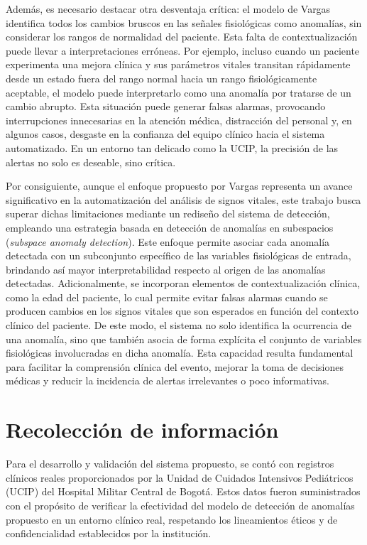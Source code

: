 Además, es necesario destacar otra desventaja crítica: el modelo de Vargas identifica todos los cambios bruscos en las señales fisiológicas como anomalías, sin considerar los rangos de normalidad del paciente. Esta falta de contextualización puede llevar a interpretaciones erróneas. Por ejemplo, incluso cuando un paciente experimenta una mejora clínica y sus parámetros vitales transitan rápidamente desde un estado fuera del rango normal hacia un rango fisiológicamente aceptable, el modelo puede interpretarlo como una anomalía por tratarse de un cambio abrupto. Esta situación puede generar falsas alarmas, provocando interrupciones innecesarias en la atención médica, distracción del personal y, en algunos casos, desgaste en la confianza del equipo clínico hacia el sistema automatizado. En un entorno tan delicado como la UCIP, la precisión de las alertas no solo es deseable, sino crítica.

Por consiguiente, aunque el enfoque propuesto por Vargas representa un avance significativo en la automatización del análisis de signos vitales, este trabajo busca superar dichas limitaciones mediante un rediseño del sistema de detección, empleando una estrategia basada en detección de anomalías en subespacios (\textit{subspace anomaly detection}). Este enfoque permite asociar cada anomalía detectada con un subconjunto específico de las variables fisiológicas de entrada, brindando así mayor interpretabilidad respecto al origen de las anomalías detectadas. Adicionalmente, se incorporan elementos de contextualización clínica, como la edad del paciente, lo cual permite evitar falsas alarmas cuando se producen cambios en los signos vitales que son esperados en función del contexto clínico del paciente. De este modo, el sistema no solo identifica la ocurrencia de una anomalía, sino que también asocia de forma explícita el conjunto de variables fisiológicas involucradas en dicha anomalía. Esta capacidad resulta fundamental para facilitar la comprensión clínica del evento, mejorar la toma de decisiones médicas y reducir la incidencia de alertas irrelevantes o poco informativas.

\section{Recolección de información}

Para el desarrollo y validación del sistema propuesto, se contó con registros clínicos reales proporcionados por la Unidad de Cuidados Intensivos Pediátricos (UCIP) del Hospital Militar Central de Bogotá. Estos datos fueron suministrados con el propósito de verificar la efectividad del modelo de detección de anomalías propuesto en un entorno clínico real, respetando los lineamientos éticos y de confidencialidad establecidos por la institución.

